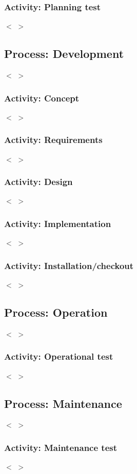 \documentclass{scrreprt}
\begin{document}
	\subsubsection{Activity: Planning test}
	$<$ $>$
	
	\subsection{Process: Development}
	$<$ $>$
	
	\subsubsection{Activity: Concept}
	$<$ $>$
	
	\subsubsection{Activity: Requirements}
	$<$ $>$
	
	\subsubsection{Activity: Design}
	$<$ $>$
	
	\subsubsection{Activity: Implementation}
	$<$ $>$
	
	\subsubsection{Activity: Installation/checkout}
	$<$ $>$
	
	\subsection{Process: Operation}
	$<$ $>$
	
	\subsubsection{Activity: Operational test}
	$<$ $>$
	
	\subsection{Process: Maintenance}
	$<$ $>$
	
	\subsubsection{Activity: Maintenance test}
	$<$ $>$
	
\end{document}
